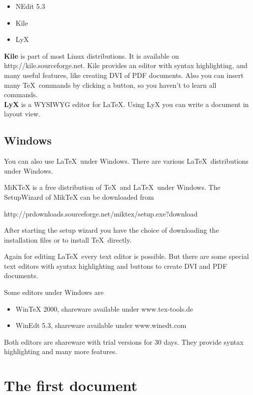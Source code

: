 \begin{itemize}
\item NEdit 5.3
\item Kile
\item LyX
\end{itemize}

\textbf{Kile} is part of most Linux distributions. 
It is available on http://kile.sourceforge.net.
Kile provides an editor with syntax highlighting, and many useful features, 
like creating DVI of PDF documents.
Also you can insert many \TeX\ commands by clicking a button, 
so you haven't to learn all commands.\\

\textbf{LyX} is a WYSIWYG editor for \LaTeX. 
Using LyX you can write a document in layout view.


\subsection{Windows}

You can also use \LaTeX\ under Windows. 
There are various \LaTeX\ distributions under Windows.

MiKTeX is a free distribution of \TeX\ and \LaTeX\ under Windows.
The SetupWizard of MikTeX can be downloaded from
 
http://prdownloads.sourceforge.net/miktex/setup.exe?download

After starting the setup wizard you have the choice of downloading the installation files 
or to install \TeX\ directly.

Again for editing \LaTeX\ every text editor is possible.
But there are some special text editors with syntax 
highlighting and buttons to create DVI and PDF documents.

Some editors under Windows are 

\begin{itemize}
\item WinTeX 2000, shareware available under www.tex-tools.de
\item WinEdt 5.3, shareware available under www.winedt.com
\end{itemize}

Both editors are shareware with trial versions for 30 days. 
They provide syntax highlighting and many more features.

\section{The first document}

